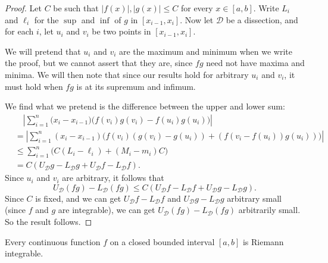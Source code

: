 \documentclass[a4paper]{article}
\begin{document}
\begin{proof}
  Let $C$ be such that $|f(x)|, |g(x)| \leq C$ for every $x\in [a, b]$. Write $L_i$ and $\ell_i$ for the $\sup$ and $\inf$ of $g$ in $[x_{i - 1}, x_i]$. Now let $\mathcal{D}$ be a dissection, and for each $i$, let $u_i$ and $v_i$ be two points in $[x_{i - 1}, x_i]$.

  We will pretend that $u_i$ and $v_i$ are the maximum and minimum when we write the proof, but we cannot assert that they are, since $fg$ need not have maxima and minima. We will then note that since our results hold for arbitrary $u_i$ and $v_i$, it must hold when $fg$ is at its supremum and infimum.

  We find what we pretend is the difference between the upper and lower sum:
  \begin{align*}
    &\quad \left|\sum_{i = 1}^n \big(x_i - x_{i - 1})(f(v_i)g(v_i) - f(u_i)g(u_i)\big)\right| \\
    &= \left|\sum_{i = 1}^{n}(x_i - x_{i - 1})\big(f(v_i)(g(v_i) - g(u_i)) + (f(v_i - f(u_i))g(u_i))\big)\right|\\
    &\leq \sum_{i = 1}^n \big(C(L_i - \ell_i) + (M_i - m_i)C\big)\\
    &=C(U_\mathcal{D}g - L_\mathcal{D}g + U_\mathcal{D}f - L_\mathcal{D}f).
  \end{align*}
  Since $u_i$ and $v_i$ are arbitrary, it follows that
  \[
    U_\mathcal{D}(fg) - L_\mathcal{D}(fg) \leq C(U_\mathcal{D}f - L_\mathcal{D}f + U_\mathcal{D}g - L_\mathcal{D}g).
  \]
  Since $C$ is fixed, and we can get $U_\mathcal{D} f - L_\mathcal{D}f$ and $U_\mathcal{D}g - L_\mathcal{D}g$ arbitrary small (since $f$ and $g$ are integrable), we can get $U_\mathcal{D}(fg) - L_\mathcal{D}(fg)$ arbitrarily small. So the result follows.
\end{proof}

\begin{thm}
  Every continuous function $f$ on a closed bounded interval $[a, b]$ is Riemann integrable.
\end{thm}
\end{document}
